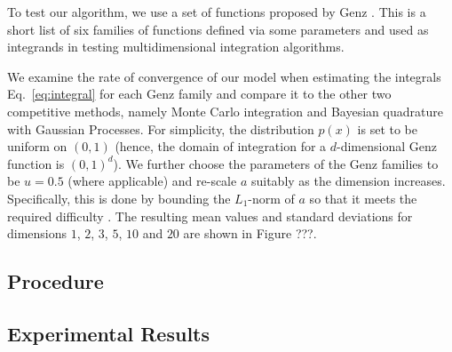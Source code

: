 To test our algorithm, we use a set of functions proposed by Genz \cite{Genz}. This is a short list of six families of functions defined via some parameters and used as integrands in testing multidimensional integration algorithms. 

We examine the rate of convergence of our model when estimating the integrals Eq.~\eqref{eq:integral} for each Genz family and compare it to the other two competitive methods, namely Monte Carlo integration and Bayesian quadrature with Gaussian Processes. For simplicity, the distribution $p(x)$ is set to be uniform on $(0, 1)$ (hence, the domain of integration for a $d$-dimensional Genz function is $(0, 1)^{d}$).  We further choose the parameters of the Genz families to be $u = 0.5$ (where applicable) and re-scale $a$ suitably as the dimension increases. Specifically, this is done by bounding the $L_1$-norm of $a$ so that it meets the required difficulty \cite{rescallingGenz}. The resulting mean values and standard deviations for dimensions $1$, $2$, $3$, $5$, $10$ and $20$ are shown in {\color{red} Figure ???}. \\

\subsection{Procedure}

\subsection{Experimental Results}

